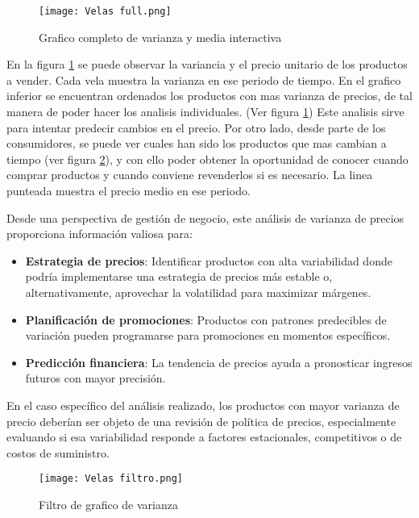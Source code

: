 \documentclass{article}
\begin{document}
\begin{figure}
    \centering
    \texttt{[image: Velas full.png]}
    \caption{Grafico completo de varianza y media interactiva}
    \label{fig:Varianza interactiva}
\end{figure}

En la figura \ref{fig:Varianza interactiva} se puede observar la variancia y el precio unitario de los productos a vender.
Cada vela muestra la varianza en ese periodo de tiempo. En el grafico inferior se encuentran ordenados los productos con mas varianza de precios, de tal manera de poder hacer los analisis individuales. (Ver figura \ref{fig:Varianza interactiva})
Este analisis sirve para intentar predecir cambios en el precio. Por otro lado, desde parte de los consumidores, se puede ver cuales han sido los productos que mas cambian a tiempo (ver figura \ref{fig:Filtro de grafico de varianza}), y con ello poder obtener la oportunidad de conocer cuando comprar productos y cuando conviene revenderlos si es necesario. La linea punteada muestra el precio medio en ese periodo.

Desde una perspectiva de gestión de negocio, este análisis de varianza de precios proporciona información valiosa para:

\begin{itemize}
    \item \textbf{Estrategia de precios}: Identificar productos con alta variabilidad donde podría implementarse una estrategia de precios más estable o, alternativamente, aprovechar la volatilidad para maximizar márgenes.
    \item \textbf{Planificación de promociones}: Productos con patrones predecibles de variación pueden programarse para promociones en momentos específicos.
    \item \textbf{Predicción financiera}: La tendencia de precios ayuda a pronosticar ingresos futuros con mayor precisión.
\end{itemize}

En el caso específico del análisis realizado, los productos con mayor varianza de precio deberían ser objeto de una revisión de política de precios, especialmente evaluando si esa variabilidad responde a factores estacionales, competitivos o de costos de suministro.
\begin{figure}
    \centering
    \texttt{[image: Velas filtro.png]}
    \caption{Filtro de grafico de varianza}
    \label{fig:Filtro de grafico de varianza}
\end{figure}
\end{document}
